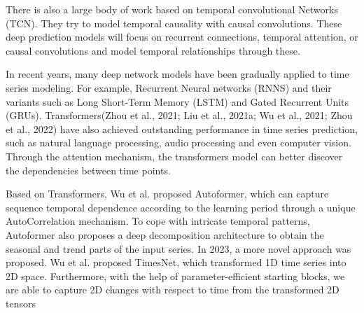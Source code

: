 There is also a large body of work based on temporal convolutional Networks (TCN). They try to model temporal causality with causal convolutions. These deep prediction models will focus on recurrent connections, temporal attention, or causal convolutions and model temporal relationships through these.

In recent years, many deep network models have been gradually applied to time series modeling. For example, Recurrent Neural networks (RNNS) and their variants such as Long Short-Term Memory (LSTM) and Gated Recurrent Units (GRUs). Transformers(Zhou et al., 2021; Liu et al., 2021a;  Wu et al., 2021; Zhou et al., 2022) have also achieved outstanding performance in time series prediction, such as natural language processing, audio processing and even computer vision. Through the attention mechanism, the transformers model can better discover the dependencies between time points.

Based on Transformers, Wu et al. proposed Autoformer\cite{NEURIPS2021_bcc0d400}, which can capture sequence temporal dependence according to the learning period through a unique AutoCorrelation mechanism. To cope with intricate temporal patterns, Autoformer also proposes a deep decomposition architecture to obtain the seasonal and trend parts of the input series. In 2023, a more novel approach was proposed. Wu et al. proposed TimesNet\cite{DBLP:journals/corr/abs-2210-02186}, which transformed 1D time series into 2D space. Furthermore, with the help of parameter-efficient starting blocks, we are able to capture 2D changes with respect to time from the transformed 2D tensors


